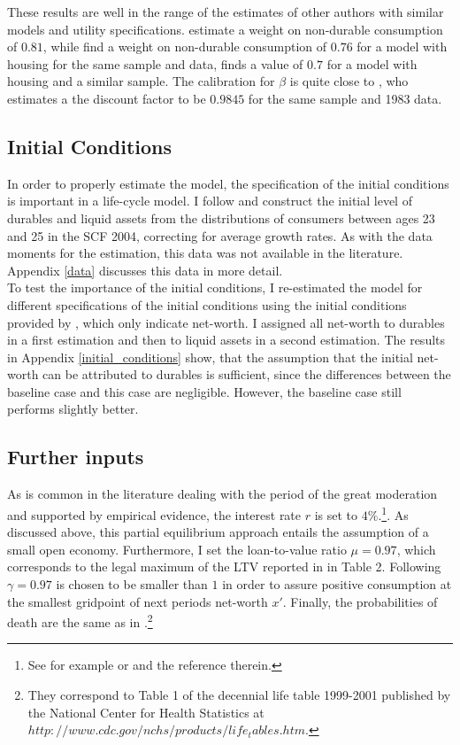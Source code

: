 \documentclass[a4paper,12pt,legno]{article}
\begin{document}
These results are well in the range of the estimates of other authors with similar models and utility specifications. \cite{FV&K2011} estimate a weight on non-durable consumption of $0.81$, while \cite{hintermaier2016} find a weight on non-durable consumption of $0.76$ for a model with housing for the same sample and data, \cite{gruber2003precautionary} finds a value of $0.7$ for a model with housing and a similar sample.
The calibration for $\beta$ is quite close to \cite{hintermaier2011}, who estimates a the discount factor to be $0.9845$ for the same sample and 1983 data. 

\subsection{Initial Conditions}
In order to properly estimate the model, the specification of the initial conditions is important in a life-cycle model. I follow \cite{hintermaier2011} and construct the initial level of durables and liquid assets from the distributions of consumers between ages 23 and 25 in the SCF 2004, correcting for average growth rates. As with the data moments for the estimation, this data was not available in the literature. Appendix \ref{data} discusses this data in more detail. \\
To test the importance of the initial conditions, I re-estimated the model for different specifications of the initial conditions using the initial conditions provided by \cite{hintermaier2011}, which only indicate net-worth. I assigned all net-worth to durables in a first estimation and then to liquid assets in a second estimation. The results in Appendix \ref{initial_conditions} show, that the assumption that the initial net-worth can be attributed to durables is sufficient, since the differences between the baseline case and this case are negligible. However, the baseline case still performs slightly better. 

\subsection{Further inputs}

As is common in the literature dealing with the period of the great moderation and supported by empirical evidence, the interest rate $r$ is set to $4\%$.\footnote{See for example \citep{FV&K2011} or \cite{hintermaier2011} and the reference therein.}. As discussed above, this partial equilibrium approach entails the assumption of a small open economy. Furthermore, I set the loan-to-value ratio $\mu = 0.97$, which corresponds to the legal maximum of the LTV reported in \cite{green2005american} in Table 2. Following \cite{hintermaier2010} $\gamma = 0.97$ is chosen to be smaller than $1$ in order to assure positive consumption at the smallest gridpoint of next periods net-worth $x'$. Finally, the probabilities of death are the same as in \cite{hintermaier2011}.\footnote{They correspond to Table 1 of the decennial life table 1999-2001 published by the National Center for Health Statistics at $http://www.cdc.gov/nchs/products/life_tables.htm$.} 
\end{document}
